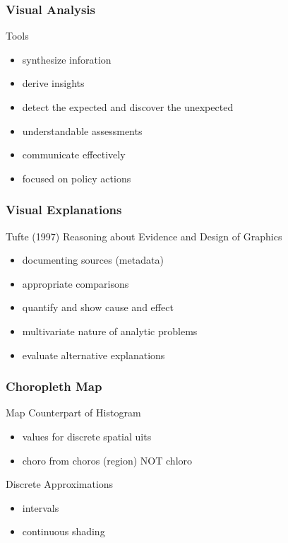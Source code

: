 \documentclass[nototal,handout]{beamer}
\begin{document}
\begin{frame}
	\frametitle{Visual Analysis}
 
\begin{block}{Tools}
 \begin{itemize}
 \item  synthesize inforation
 \item  derive insights
 \item  detect the expected and discover the unexpected
 \item  understandable assessments
 \item  communicate effectively
 \item  focused on policy actions
 \end{itemize}
 \end{block} \end{frame} 

\begin{frame}
	\frametitle{Visual Explanations}
 
\begin{block}{Tufte (1997)}
  Reasoning about Evidence and Design of Graphics
 \begin{itemize}
 \item  documenting sources (metadata)
 \item  appropriate comparisons
 \item  quantify and show cause and effect
 \item  multivariate nature of analytic problems
 \item  evaluate alternative explanations
 \end{itemize}
 \end{block} \end{frame} 

\begin{frame}
	\frametitle{Choropleth Map}
 
\begin{block}{Map Counterpart of Histogram}
 \begin{itemize}
 \item  values for discrete spatial uits
 \item  choro from  choros (region) NOT chloro
 \end{itemize}
 \end{block} 
\begin{block}{Discrete Approximations}
 \begin{itemize}
 \item  intervals
 \item  continuous shading
 \end{itemize}
 \end{block} \end{frame} 
\end{document}
